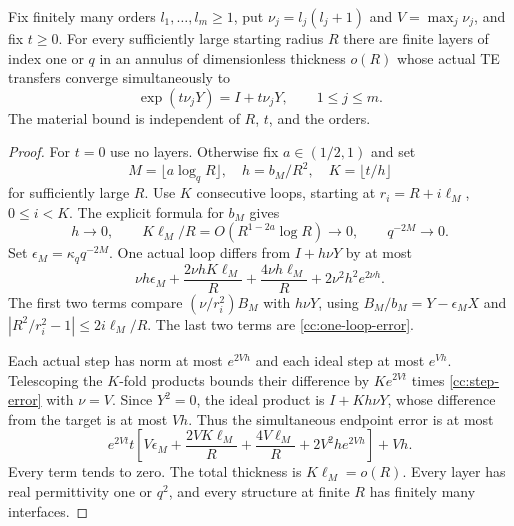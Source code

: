 \begin{theorem}
\label{cc:angular-shear}
Fix finitely many orders $l_1,\ldots,l_m\geq1$, put
$\nu_j=l_j(l_j+1)$ and $V=\max_j\nu_j$, and fix $t\geq0$.
For every sufficiently large starting radius $R$ there are finite
layers of index one or $q$ in an annulus of dimensionless thickness
$o(R)$ whose actual TE transfers converge simultaneously to
\begin{equation}\label{cc:angular-shear-target}
 \exp(t\nu_jY)=I+t\nu_jY,\qquad 1\leq j\leq m .
\end{equation}
The material bound is independent of $R$, $t$, and the orders.
\end{theorem}
\begin{proof}
For $t=0$ use no layers. Otherwise fix $a\in(1/2,1)$ and set
\begin{equation}\label{cc:scales}
 M=\lfloor a\log_qR\rfloor,\quad h=b_M/R^2,\quad
 K=\lfloor t/h\rfloor
\end{equation}
for sufficiently large $R$. Use $K$ consecutive loops, starting
at $r_i=R+i\ell_M$, $0\leq i<K$. The explicit formula for $b_M$
gives
\[
 h\to0,\qquad K\ell_M/R=O(R^{1-2a}\log R)\to0,\qquad
 q^{-2M}\to0.
\]
Set $\epsilon_M=\kappa_qq^{-2M}$. One actual loop differs from
$I+h\nu Y$ by at most
\begin{equation}\label{cc:step-error}
 \nu h\epsilon_M+\frac{2\nu hK\ell_M}{R}
       +\frac{4\nu h\ell_M}{R}+2\nu^2h^2e^{2\nu h}.
\end{equation}
The first two terms compare $(\nu/r_i^2)B_M$ with $h\nu Y$,
using $B_M/b_M=Y-\epsilon_MX$ and
$|R^2/r_i^2-1|\leq2i\ell_M/R$. The last two terms are
\eqref{cc:one-loop-error}.

Each actual step has norm at most $e^{2Vh}$ and each ideal step
at most $e^{Vh}$. Telescoping the $K$-fold products bounds their
difference by $Ke^{2Vt}$ times \eqref{cc:step-error} with $\nu=V$.
Since $Y^2=0$, the ideal product is $I+Kh\nu Y$, whose difference
from the target is at most $Vh$. Thus the simultaneous endpoint
error is at most
\begin{equation}\label{cc:global-error}
 e^{2Vt}t\left[
 V\epsilon_M+\frac{2VK\ell_M}{R}
       +\frac{4V\ell_M}{R}+2V^2h e^{2Vh}\right]+Vh.
\end{equation}
Every term tends to zero. The total thickness is $K\ell_M=o(R)$.
Every layer has real permittivity one or $q^2$, and every
structure at finite $R$ has finitely many interfaces.
\end{proof}

